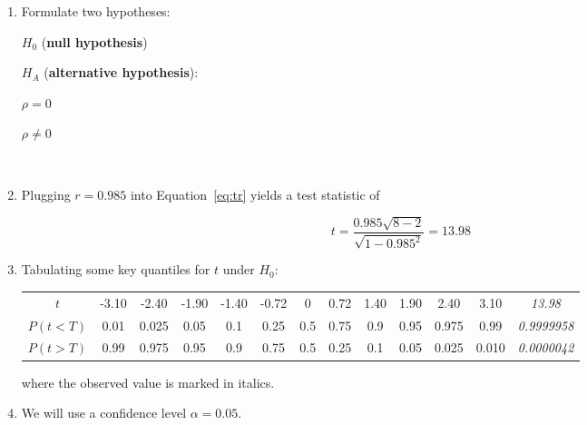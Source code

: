 \begin{enumerate}
\item Formulate two hypotheses:

  \noindent\begin{minipage}{.4\textwidth}
  $H_0$ (\textbf{null hypothesis})
  
  \vspace{1em}
  
  $H_{\!A}$ (\textbf{alternative hypothesis}):
\end{minipage}
\begin{minipage}{.2\textwidth}
\end{minipage}
\begin{minipage}{.2\textwidth}
  $\rho=0$
  
  \vspace{1em}
  
  $\rho\neq{0}$
\end{minipage}
\begin{minipage}{.2\textwidth}
\end{minipage}\\

\item Plugging $r = 0.985$ into Equation~\ref{eq:tr} yields a test
  statistic of

  \[
  t = \frac{0.985\sqrt{8-2}}{\sqrt{1-0.985^2}} = 13.98
  \]

\item Tabulating some key quantiles for $t$ under $H_0$:

  \begin{center}
    \begin{tabular}{c|c@{\gap}c@{\gap}c@{\gap}c@{\gap}
        c@{\gap}c@{\gap}c@{\gap}c@{\gap}c@{\gap}c@{\gap}c@{\gap}c}
      $t$ & -3.10 & -2.40 & -1.90 & -1.40 & -0.72 &
      0 & 0.72 & 1.40 & 1.90 & 2.40 & 3.10 & \emph{13.98}\\
      $P(t<T)$ & 0.01 & 0.025 & 0.05 & 0.1 & 0.25 &
      0.5 & 0.75 & 0.9 & 0.95 & 0.975 & 0.99 & \emph{0.9999958}\\
      $P(t>T)$ & 0.99 & 0.975 & 0.95 & 0.9 & 0.75 & 0.5 &
      0.25 & 0.1 & 0.05 & 0.025 & 0.010 & \emph{0.0000042}
    \end{tabular}
  \end{center}

  \noindent where the observed value is marked in italics.
  
\item We will use a confidence level $\alpha = 0.05$.


\end{enumerate}
